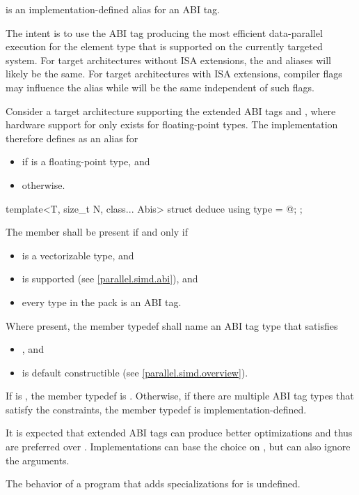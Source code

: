 \pnum
{} is an implementation-defined alias for an ABI tag. \begin{note}The intent is to use the ABI tag producing the most efficient data-parallel execution for the element type  that is supported on the currently targeted system. For target architectures without ISA extensions, the  and  aliases will likely be the same. For target architectures with ISA extensions, compiler flags may influence the  alias while  will be the same independent of such flags.\end{note}
\begin{example}
  Consider a target architecture supporting the extended ABI tags  and , where hardware support for  only exists for floating-point types. The implementation therefore defines  as an alias for
  \begin{itemize}
    \item {} if  is a floating-point type, and
    \item {} otherwise.
  \end{itemize}
\end{example}

\begin{itemdecl}
template<T, size_t N, class... Abis> struct deduce { using type = @\seebelow@; };
\end{itemdecl}

\begin{itemdescr}
\pnum
The member  shall be present if and only if
\begin{itemize}
  \item {} is a vectorizable type, and
  \item {} is supported (see \ref{parallel.simd.abi}), and
  \item every type in the  pack is an ABI tag.
\end{itemize}

\pnum
Where present, the member typedef  shall name an ABI tag type that satisfies
\begin{itemize}
  \item {}, and
  \item {} is default constructible (see \ref{parallel.simd.overview}).
\end{itemize}
If  is , the member typedef  is . Otherwise, if there are multiple ABI tag types that satisfy the constraints, the member typedef  is implementation-defined. \begin{note}It is expected that extended ABI tags can produce better optimizations and thus are preferred over .
Implementations can base the choice on , but can also ignore the  arguments.
\end{note}

\pnum
The behavior of a program that adds specializations for  is undefined.
\end{itemdescr}

